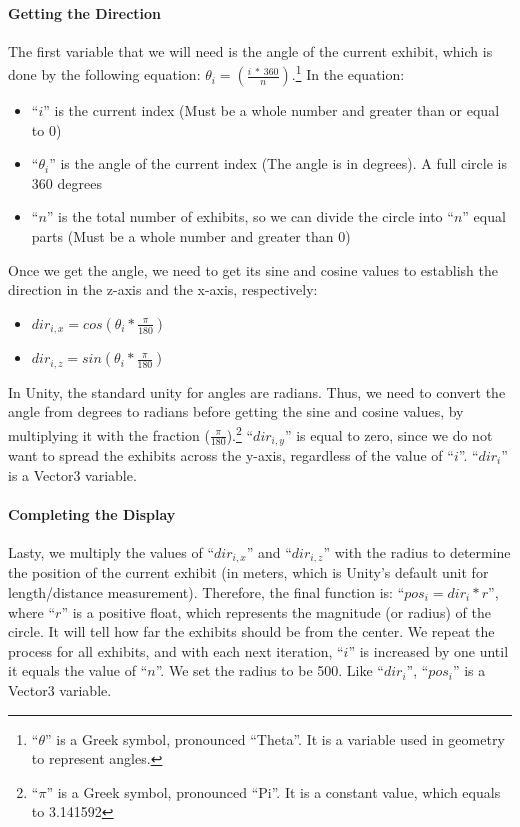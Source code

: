 \paragraph{Getting the Direction}
The first variable that we will need is the angle of the current exhibit, which is done by the following equation: $\theta_i = (\frac{i \ * \ 360}{n})$.\footnote{“$\theta$” is a Greek symbol, pronounced “Theta”. It is a variable used in geometry to represent angles.}  In the equation:
\begin{itemize}
    \item{“$i$” is the current index (Must be a whole number and greater than or equal to 0)}
    
    \item{“$\theta_i$” is the angle of the current index (The angle is in degrees). A full circle is 360 degrees}
    
    \item{“$n$” is the total number of exhibits, so we can divide the circle into “$n$” equal parts (Must be a whole number and greater than 0)}
\end{itemize}

Once we get the angle, we need to get its sine and cosine values to establish the direction in the z-axis and the x-axis, respectively:
\begin{itemize}
    \item {$dir_{i, x} = cos(\theta_i * \frac{\pi}{180})$}
    \item {$dir_{i, z} = sin(\theta_i * \frac{\pi}{180})$}
 \end{itemize}
In Unity, the standard unity for angles are radians. Thus, we need to convert the angle from degrees to radians before getting the sine and cosine values, by multiplying it with the fraction ($\frac{\pi}{180}$).\footnote{“$\pi$” is a Greek symbol, pronounced “Pi”. It is a constant value, which equals to 3.141592}  “$dir_{i, y}$” is equal to zero, since we do not want to spread the exhibits across the y-axis, regardless of the value of “$i$”. “$dir_i$” is a Vector3 variable.


\paragraph{Completing the Display}
Lasty, we multiply the values of “$dir_{i, x}$” and “$dir_{i, z}$” with the radius to determine the position of the current exhibit (in meters, which is Unity’s default unit for length/distance measurement). Therefore, the final function is: “$pos_i = dir_i * r$”, where “$r$” is a positive float, which represents the magnitude (or radius) of the circle. It will tell how far the exhibits should be from the center. We repeat the process for all exhibits, and with each next iteration, “$i$” is increased by one until it equals the value of “$n$”. We set the radius to be 500. Like “$dir_i$”, “$pos_i$” is a Vector3 variable.


